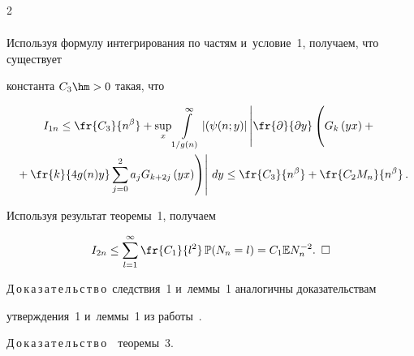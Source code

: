 \begin{multicols}{2}
\begin{align*}
\end{align*}





Используя формулу интегрирования по частям и~условие~1, получаем, что существует 


константа $C_3\hm>0$ такая, что


\begin{multline*}


I_{1n}\leq \fr{C_3}{n^{\beta}} + \sup\limits_{x}    \int\limits_{1/g(n)}^{\infty} \left| 


(\psi(n;y)\right| \left|\fr{\partial}{\partial y} \left(


\vphantom{\sum\limits_{j=0}^{2}}


 G_k\left(yx \right) + {}\right.\right.\\


\left.\left.{}+


\fr{k}{4g(n)y}\sum\limits_{j=0}^{2}a_j G_{k+2j}\left(yx \right) \right)\right| \,dy 


\leq \fr{C_3}{n^{\beta}} + \fr{C_2 M_n}{n^{\beta}}\,.


\end{multline*}





Используя результат теоремы~1, получаем


\begin{equation*}


I_{2n} \leq  \sum\limits_{l=1}^{\infty} \fr{C_1}{l^2}\,\mathbb{P}(N_n=l) = 


C_1\mathbb{E}N_n^{-2}. \enskip \square


\end{equation*}









\noindent


Д\,о\,к\,а\,з\,а\,т\,е\,л\,ь\,с\,т\,в\,о\ следствия~1 и~леммы~1 аналогичны доказательствам 


утверждения~1 и~леммы~1 из работы~\cite{CMU}.





 


\noindent


Д\,о\,к\,а\,з\,а\,т\,е\,л\,ь\,с\,т\,в\,о\ \ теоремы~3.






\end{multicols}

